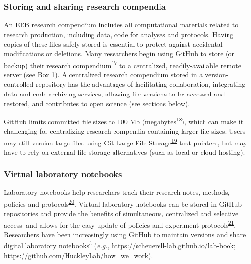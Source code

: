 \hypertarget{storing-and-sharing-research-compendia}{%
\subsubsection{Storing and sharing research compendia}\label{storing-and-sharing-research-compendia}}

An EEB research compendium includes all computational materials related to research production, including data, code for analyses and protocols.
Having copies of these files safely stored is essential to protect against accidental modifications or deletions.
Many researchers begin using GitHub to store (or backup) their research compendium\textsuperscript{\protect\hyperlink{ref-MwwMapRG}{17}} to a centralized, readily-available remote server (see \protect\hyperlink{definitions}{Box 1}).
A centralized research compendium stored in a version-controlled repository has the advantages of facilitating collaboration, integrating data and code archiving services, allowing file versions to be accessed and restored, and contributes to open science (see sections below).

GitHub limits committed file sizes to 100 Mb (megabytes\textsuperscript{\protect\hyperlink{ref-1Co6ZZjF1}{18}}), which can make it challenging for centralizing research compendia containing larger file sizes.
Users may still version large files using Git Large File Storage\textsuperscript{\protect\hyperlink{ref-11GtZ7icJ}{19}} text pointers, but may have to rely on external file storage alternatives (such as local or cloud-hosting).

\hypertarget{virtual-laboratory-notebooks}{%
\subsubsection{Virtual laboratory notebooks}\label{virtual-laboratory-notebooks}}

Laboratory notebooks help researchers track their research notes, methods, policies and protocols\textsuperscript{\protect\hyperlink{ref-wwHxTOtm}{20}}.
Virtual laboratory notebooks can be stored in GitHub repositories and provide the benefits of simultaneous, centralized and selective access, and allows for the easy update of policies and experiment protocols\textsuperscript{\protect\hyperlink{ref-10V7x4H4l}{21}}.
Researchers have been increasingly using GitHub to maintain versions and share digital laboratory notebooks\textsuperscript{\protect\hyperlink{ref-10ghgV3S8}{3}} (\emph{e.g.}, \url{https://scheuerell-lab.github.io/lab-book}; \url{https://github.com/HuckleyLab/how_we_work}).

